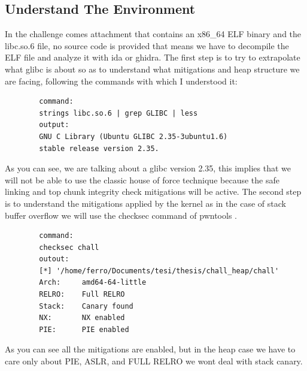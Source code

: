     \subsection{Understand The Environment}
    In the challenge comes attachment that contains an x86\_64 ELF binary and the libc.so.6 file, no source code is provided that means we have to decompile the ELF file and analyze it with ida or ghidra.\newline
    The first step is to try to extrapolate what glibc is about so as to understand what mitigations and heap structure we are facing, following the commands with which I understood it:
    \begin{verbatim}
        command:
        strings libc.so.6 | grep GLIBC | less
        output:
        GNU C Library (Ubuntu GLIBC 2.35-3ubuntu1.6) 
        stable release version 2.35.
    \end{verbatim}
    As you can see, we are talking about a glibc version 2.35, this implies that we will not be able to use the classic house of force technique because the safe linking and top chunk integrity check mitigations will be active.\newline
    The second step is to understand the mitigations applied by the kernel as in the case of stack buffer overflow we will use the checksec command of pwntools   .\newline
    \clearpage
    \begin{verbatim}
        command:
        checksec chall
        outout:
        [*] '/home/ferro/Documents/tesi/thesis/chall_heap/chall'
        Arch:     amd64-64-little
        RELRO:    Full RELRO
        Stack:    Canary found
        NX:       NX enabled
        PIE:      PIE enabled
    \end{verbatim}
    As you can see all the mitigations are enabled, but in the heap case we have to care only about PIE, ASLR, and FULL RELRO we wont deal with stack canary.
